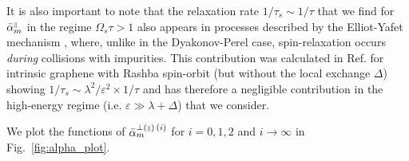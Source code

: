 It is also important to note that the relaxation rate $1/\tau_s\sim 1/\tau$ that we find for $\bar{\alpha}_m^{{\scriptscriptstyle\parallel}}$ in the regime $\Omega_s \tau > 1$ also appears in processes described by the Elliot-Yafet mechanism \cite{elliott_theory_1954, yafet_g_1963}, where, unlike in the Dyakonov-Perel case, spin-relaxation occurs \emph{during} collisions with impurities. This contribution was calculated in Ref. \cite{huertas-hernando_spin-orbit-mediated_2009} for intrinsic graphene with Rashba spin-orbit (but without the local exchange $\Delta$) showing $1/\tau_s \sim \lambda^2/\varepsilon^2 \times 1/\tau $ and has therefore a negligible contribution in the high-energy regime (i.e. $\varepsilon \gg \lambda + \Delta$) that we consider.

We plot the functions of $\bar{\alpha}_{m}^{\perp({\scriptscriptstyle\parallel})\,(i)}$ for $i=0,1,2$ and $i\rightarrow\infty$ in Fig.~\ref{fig:alpha_plot}. 



